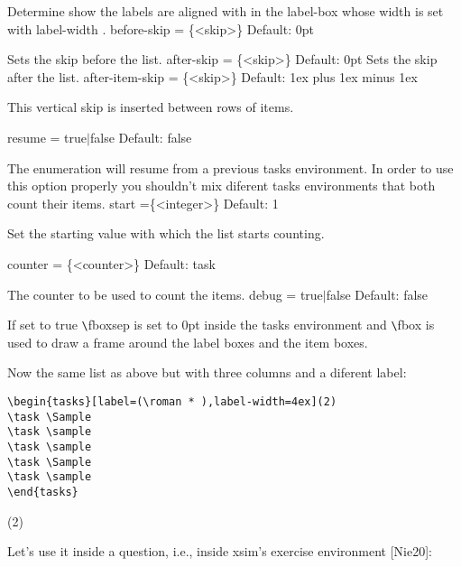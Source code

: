 \documentclass[a4paper,12pt,indent]{article}
\begin{document}
Determine show the labels are aligned with in the label-box whose width is set with label-width .
before-skip = \{<skip>\} \hfill Default: 0pt

Sets the skip before the list.
after-skip = \{<skip>\} \hfill Default: 0pt
Sets the skip after the list.
after-item-skip = \{<skip>\} \hfill  Default: 1ex plus 1ex minus 1ex

This vertical skip is inserted between rows of items.

resume = true$|$false \hfill Default: false

The enumeration will resume from a previous tasks environment. In order to use this option
properly you shouldn’t mix diferent tasks environments that both count their items.
start =\{<integer>\} \hfill Default: 1

Set the starting value with which the list starts counting.

counter = \{<counter>\} Default: task

The counter to be used to count the items.
debug = true$|$false Default: false

If set to true \verb|\|\textcolor{Tasks}{fboxsep} is set to 0pt inside the tasks environment and \verb|\|\textcolor{Tasks}{fbox} is used to draw a
frame around the label boxes and the item boxes.

Now the same list as above but with three columns and a diferent label:

\begin{tcolorbox}[collower=black,colframe=Tasks,colback=white]
    \begin{lstlisting}
\begin{tasks}[label=(\roman * ),label-width=4ex](2)
\task \Sample
\task \sample
\task \sample
\task \Sample
\task \sample
\end{tasks}
\end{lstlisting}
        \tcblower
        \begin{tasks}[
        label=(),
        label-width=4ex
        ](2)
            \task \Sample
            \task \sample
            \task \sample
            \task \Sample
    \end{tasks}
           \end{tcolorbox}

Let's use it inside a question, i.e., inside xsim’s exercise environment [Nie20]:
\end{document}
